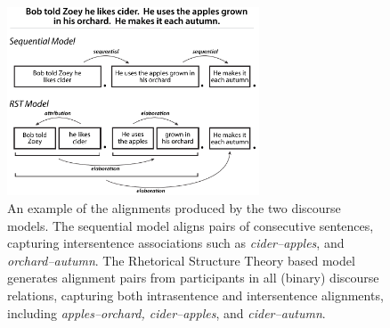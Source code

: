 %
%
%
%
%


\begin{figure}[t!]
\begin{center}
\includegraphics[width=75mm]{mainmatter/naacl2015-alignment/rst2a.pdf}
\caption{{\small An example of the alignments produced by the two discourse models.  The sequential model aligns pairs of consecutive sentences, capturing intersentence associations such as \emph{cider--apples}, and \emph{orchard--autumn}.  The Rhetorical Structure Theory based model generates alignment pairs from participants in all (binary) discourse relations, capturing both intrasentence and intersentence alignments, including 
\emph{apples--orchard, cider--apples}, and \emph{cider--autumn}.}}
\label{fig:examples}
\end{center}
\end{figure}

